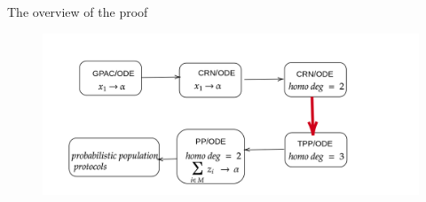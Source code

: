 \documentclass[aspectratio=169]{beamer}
\begin{document}
\begin{frame}{The overview of the proof}
    \begin{figure}[tb]
        \centering
        \includegraphics[scale=0.25]{flow2}
    \end{figure}
\end{frame}
\end{document}
